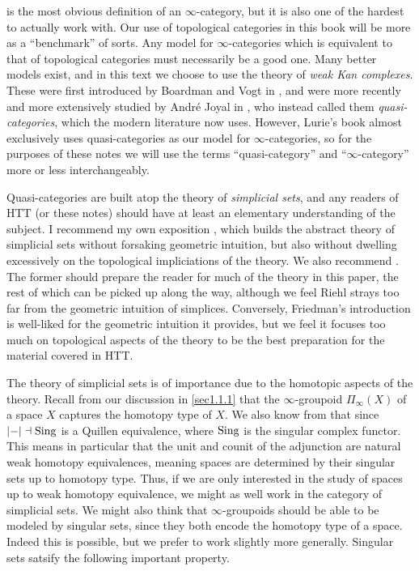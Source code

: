  is the most obvious definition of an $\infty $-category, but it is also one of the hardest to actually work with. Our use of topological categories in this book will be more as a ``benchmark'' of sorts. Any model for $\infty $-categories which is equivalent to that of topological categories must necessarily be a good one. Many better models exist, and in this text we choose to use the theory of \emph{weak Kan complexes}. These were first introduced by Boardman and Vogt in \cite{BV73}, and were more recently and more extensively studied by Andr\'e Joyal in \cite{joyal08a,joyal08b}, who instead called them \emph{quasi-categories}, which the modern literature now uses. However, Lurie's book almost exclusively uses quasi-categories as our model for $\infty $-categories, so for the purposes of these notes we will use the terms ``quasi-category'' and ``$\infty $-category'' more or less interchangeably.

Quasi-categories are built atop the theory of \emph{simplicial sets}, and any readers of HTT (or these notes) should have at least an elementary understanding of the subject. I recommend my own exposition \cite{ssets}, which builds the abstract theory of simplicial sets without forsaking geometric intuition, but also without dwelling excessively on the topological impliciations of the theory. We also recommend \cite{riehlssets,friedmanssets}. The former should prepare the reader for much of the theory in this paper, the rest of which can be picked up along the way, although we feel Riehl strays too far from the geometric intuition of simplices. Conversely, Friedman's introduction is well-liked for the geometric intuition it provides, but we feel it focuses too much on topological aspects of the theory to be the best preparation for the material covered in HTT.

The theory of simplicial sets is of importance due to the homotopic aspects of the theory. Recall from our discussion in \cref{sec1.1.1} that the $\infty $-groupoid $\Pi_\infty (X)$ of a space $X$ captures the homotopy type of $X$. We also know from \cite{quillen67} that since $\left| - \right| \dashv\operatorname{Sing}$ is a Quillen equivalence, where $\operatorname{Sing}$ is the singular complex functor. This means in particular that the unit and counit of the adjunction are natural weak homotopy equivalences, meaning spaces are determined by their singular sets up to homotopy type. Thus, if we are only interested in the study of spaces up to weak homotopy equivalence, we might as well work in the category of simplicial sets. We might also think that $\infty $-groupoids should be able to be modeled by singular sets, since they both encode the homotopy type of a space. Indeed this is possible, but we prefer to work slightly more generally. Singular sets satsify the following important property.

